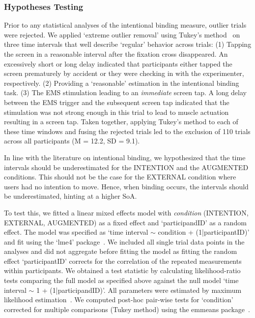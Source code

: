 \subsubsection{Hypotheses Testing}
Prior to any statistical analyses of the intentional binding measure, outlier trials were rejected. We applied `extreme outlier removal' using Tukey's method~\cite{Tukey1949-sl} on three time intervals that well describe `regular' behavior across trials: (1) Tapping the screen in a reasonable interval after the fixation cross disappeared. An excessively short or long delay indicated that participants either tapped the screen prematurely by accident or they were checking in with the experimenter, respectively. (2) Providing a `reasonable' estimation in the intentional binding task. (3) The EMS stimulation leading to an \textit{immediate} screen tap. A long delay between the EMS trigger and the subsequent screen tap indicated that the stimulation was not strong enough in this trial to lead to muscle actuation resulting in a screen tap. Taken together, applying Tukey's method to each of these time windows and fusing the rejected trials led to the exclusion of 110 trials across all participants (M = 12.2, SD = 9.1). %

In line with the literature on intentional binding, we hypothesized that the time intervals should be underestimated for the INTENTION and the AUGMENTED conditions. This should not be the case for the EXTERNAL condition where users had no intention to move. Hence, when binding occurs, the intervals should be underestimated, hinting at a higher SoA. 

To test this, we fitted a linear mixed effects model with \textit{condition} (INTENTION, EXTERNAL, AUGMENTED) as a fixed effect and `participandID' as a random effect. The model was specified as `time interval $\sim$ condition + (1|participantID)' and fit using the `lme4' package~\cite{Bates2015-bh}. We included all single trial data points in the analyses and did not aggregate before fitting the model as fitting the random effect `participantID' corrects for the correlation of the repeated measurements within participants. We obtained a test statistic by calculating likelihood-ratio tests comparing the full model as specified above against the null model `time interval $\sim$ 1 + (1|participandID)'. All parameters were estimated by maximum likelihood estimation~\cite{Pinheiro2006-bk}. We computed post-hoc pair-wise tests for `condition' corrected for multiple comparisons (Tukey method) using the emmeans package~\cite{Lenth2020-xk}.

